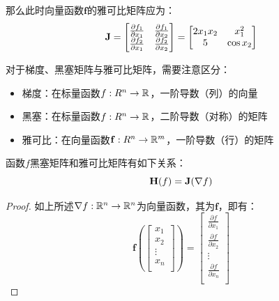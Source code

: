 \documentclass[11pt]{article}
\begin{document}
\begin{appendices}
\begin{example}
    那么此时向量函数$\mathbf{f}$的雅可比矩阵应为：
    \begin{equation*}
       \mathbf{J} = \begin{bmatrix}
            \frac{\partial f_1}{\partial x_1} & \frac{\partial f_1}{\partial x_2} \\
            \frac{\partial f_2}{\partial x_1} & \frac{\partial f_2}{\partial x_2} \\
        \end{bmatrix}
        = \begin{bmatrix}
            2 x_1 x_2 & x_1^2 \\
            5 & \cos x_2 \\
        \end{bmatrix}
    \end{equation*}
    
\end{example}

对于梯度、黑塞矩阵与雅可比矩阵，需要注意区分：
\begin{itemize}
    \item 梯度：在标量函数$f:R^n \rightarrow \mathbb{R}$，一阶导数（列）的向量
    \item 黑塞：在标量函数$f:R^n \rightarrow \mathbb{R}$，二阶导数（对称）的矩阵
    \item 雅可比：在向量函数$\mathbf{f}:R^n \rightarrow \mathbb{R}^m$，一阶导数（行）的矩阵
\end{itemize}

\begin{property}
函数$f$黑塞矩阵和雅可比矩阵有如下关系：
\begin{equation*}
    \mathbf{H}(f) = \mathbf{J}(\nabla{f})
\end{equation*}
\end{property}

\begin{proof}
    如上所述$\nabla f: \mathbb{R}^n \rightarrow \mathbb{R}^n$为向量函数，其为$\mathbf{f}$，即有：
    \begin{equation*}
        \mathbf{f} \left(
        \begin{bmatrix}
            x_1 \\
            x_2 \\
            \vdots \\
            x_n \\
        \end{bmatrix}
        \right)
        = \begin{bmatrix}
            \frac{\partial f}{\partial x_1} \\
            \frac{\partial f}{\partial x_2} \\
            \vdots \\
            \frac{\partial f}{\partial x_n} \\
        \end{bmatrix}
    \end{equation*}


\end{proof}
\end{appendices}
\end{document}
